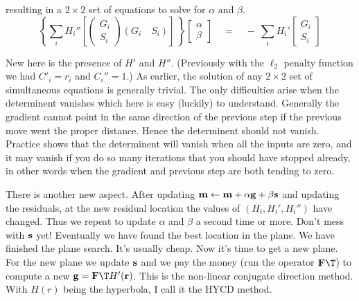 %
resulting in a $2\times 2$ set of equations to solve for $\alpha$ and $\beta$.
%
\begin{equation}
\label{eqn:2x2}
\left\{
\sum_i H_i'' \left[
	\left( \begin{array}{c} G_i \\ S_i\end{array} \right)
	     ( G_i \quad S_i) 
     \right] \
\right\}
\left[ \begin{array}{c} \alpha \\ \beta \end{array} \right]
\quad=\quad -\ 
\sum_i H_i'
	\left[ \begin{array}{c} G_i \\ S_i\end{array} \right]
\end{equation}
\par
New here is the presence of $H'$ and $H''$.
(Previously with the $\ell_2$ penalty function we had $C'_i=r_i$ and $C_i''=1$.)
As earlier, the solution of any $2\times 2$ set of simultaneous equations is generally trivial.
The only difficulties arise when the determinent vanishes
which here is easy (luckily) to understand.
Generally the gradient cannot point in the same direction of the previous step
if the previous move went the proper distance.
Hence the determinent should not vanish.
Practice shows that the determinent will vanish when all the inputs are zero,
and it may vanish if you do so many iterations that you should have stopped already,
in other words when the gradient and previous step are both tending to zero.

\par
There is another new aspect.
After updating
$\bold m \leftarrow \bold m +\alpha \bold g +\beta \bold s$
and updating the residuals,
at the new residual location the values of $(H_i, H_i', H_i'')$ have changed.
Thus we repeat to update $\alpha$ and $\beta$ a second time or more.
Don't mess with $\bold s$ yet!
Eventually we have found the best location in the plane.
We have finished the plane search.   It's usually cheap.
Now it's time to get a new plane.
For the new plane we update $\bold s$
and we pay the money (run the operator $\bold F\T$) to compute a new 
$\bold g = \bold F\T H'(\bold r)$.
This is the non-linear conjugate direction method.
With $H(r)$ being the hyperbola, I call it the HYCD method.

